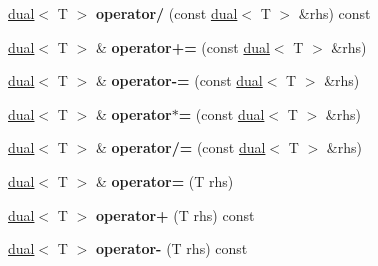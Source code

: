 \begin{DoxyCompactItemize}
\item 
\hypertarget{struct_d_r_d_s_p_1_1dual_ac838ce569f85fd920d587bfe22b4228c}{\hyperlink{struct_d_r_d_s_p_1_1dual}{dual}$<$ T $>$ {\bfseries operator/} (const \hyperlink{struct_d_r_d_s_p_1_1dual}{dual}$<$ T $>$ \&rhs) const }\label{struct_d_r_d_s_p_1_1dual_ac838ce569f85fd920d587bfe22b4228c}

\item 
\hypertarget{struct_d_r_d_s_p_1_1dual_af928d72c558bc5251f48e3a8ef43e499}{\hyperlink{struct_d_r_d_s_p_1_1dual}{dual}$<$ T $>$ \& {\bfseries operator+=} (const \hyperlink{struct_d_r_d_s_p_1_1dual}{dual}$<$ T $>$ \&rhs)}\label{struct_d_r_d_s_p_1_1dual_af928d72c558bc5251f48e3a8ef43e499}

\item 
\hypertarget{struct_d_r_d_s_p_1_1dual_aeea91211e526cfd1ff76dd99228045fa}{\hyperlink{struct_d_r_d_s_p_1_1dual}{dual}$<$ T $>$ \& {\bfseries operator-\/=} (const \hyperlink{struct_d_r_d_s_p_1_1dual}{dual}$<$ T $>$ \&rhs)}\label{struct_d_r_d_s_p_1_1dual_aeea91211e526cfd1ff76dd99228045fa}

\item 
\hypertarget{struct_d_r_d_s_p_1_1dual_a5bdcc4cd454cd6b3a775d0e3ac9de853}{\hyperlink{struct_d_r_d_s_p_1_1dual}{dual}$<$ T $>$ \& {\bfseries operator$\ast$=} (const \hyperlink{struct_d_r_d_s_p_1_1dual}{dual}$<$ T $>$ \&rhs)}\label{struct_d_r_d_s_p_1_1dual_a5bdcc4cd454cd6b3a775d0e3ac9de853}

\item 
\hypertarget{struct_d_r_d_s_p_1_1dual_a68be03e1a9a0ae79edbcb1b012b4567b}{\hyperlink{struct_d_r_d_s_p_1_1dual}{dual}$<$ T $>$ \& {\bfseries operator/=} (const \hyperlink{struct_d_r_d_s_p_1_1dual}{dual}$<$ T $>$ \&rhs)}\label{struct_d_r_d_s_p_1_1dual_a68be03e1a9a0ae79edbcb1b012b4567b}

\item 
\hypertarget{struct_d_r_d_s_p_1_1dual_ac694c41d16a43f1a563d03dfda4cd7de}{\hyperlink{struct_d_r_d_s_p_1_1dual}{dual}$<$ T $>$ \& {\bfseries operator=} (T rhs)}\label{struct_d_r_d_s_p_1_1dual_ac694c41d16a43f1a563d03dfda4cd7de}

\item 
\hypertarget{struct_d_r_d_s_p_1_1dual_a4eb044a0ca3c544d3523154fc29a76f3}{\hyperlink{struct_d_r_d_s_p_1_1dual}{dual}$<$ T $>$ {\bfseries operator+} (T rhs) const }\label{struct_d_r_d_s_p_1_1dual_a4eb044a0ca3c544d3523154fc29a76f3}

\item 
\hypertarget{struct_d_r_d_s_p_1_1dual_a44e440e0b29008ac9363c5421ffcdd42}{\hyperlink{struct_d_r_d_s_p_1_1dual}{dual}$<$ T $>$ {\bfseries operator-\/} (T rhs) const }\label{struct_d_r_d_s_p_1_1dual_a44e440e0b29008ac9363c5421ffcdd42}


\end{DoxyCompactItemize}
